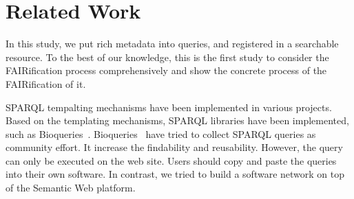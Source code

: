 \documentclass[runningheads]{llncs}
\begin{document}



\section{Related Work}
In this study, we put rich metadata into queries, and registered in a searchable resource.
To the best of our knowledge, this is the first study to consider the FAIRification process comprehensively and show the concrete process of the FAIRification of it.

SPARQL tempalting mechanisms have been implemented in various projects. Based on the templating mechanisms, SPARQL libraries have been implemented, such as Bioqueries~\cite{bioqueries}. Bioqueries~\cite{bioqueries} have tried to collect SPARQL queries as community effort. It increase the findability and reusability.
However, the query can only be executed on the web site.
Users should copy and paste the queries into their own software.
In contrast, we tried to build a software network on top of the Semantic Web platform.
\end{document}
